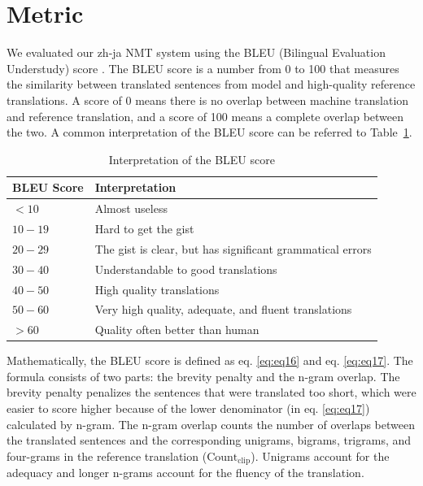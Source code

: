 \section{Metric} \label{sec:metric}

We evaluated our zh-ja NMT system using the BLEU (Bilingual Evaluation Understudy) score \cite{papineni2002bleu}. The BLEU score is a number from 0 to 100 that measures the similarity between translated sentences from model and high-quality reference translations. A score of 0 means there is no overlap between machine translation and reference translation, and a score of 100 means a complete overlap between the two. A common interpretation of the BLEU score can be referred to Table~\ref{tab:bleu_score_interpretation}.

\vspace{0.4cm}
\begin{table}[h]
    \centering
    \begin{tabularx}{\textwidth}{p{3cm}b}\toprule
        BLEU Score & Interpretation \\\midrule
        $< 10$ & Almost useless \\
        $10 - 19$ & Hard to get the gist \\
        $20 - 29$ & The gist is clear, but has significant grammatical errors \\
        $30 - 40$ & Understandable to good translations \\
        $40 - 50$ & High quality translations \\
        $50 - 60$ & Very high quality, adequate, and fluent translations \\
        $> 60$ & Quality often better than human \\
    \end{tabularx}
    \caption[Interpretation of the BLEU score]{Interpretation of the BLEU score\protect\footnotemark}
    \label{tab:bleu_score_interpretation}
\end{table}


Mathematically, the BLEU score is defined as eq. \ref{eq:eq16} and eq. \ref{eq:eq17}. The formula consists of two parts: the brevity penalty and the n-gram overlap. The brevity penalty penalizes the sentences that were translated too short, which were easier to score higher because of the lower denominator (in eq. \ref{eq:eq17}) calculated by n-gram. The n-gram overlap counts the number of overlaps between the translated sentences and the corresponding unigrams, bigrams, trigrams, and four-grams in the reference translation ($\text{Count}_\text{clip}$). Unigrams account for the adequacy and longer n-grams account for the fluency of the translation.

